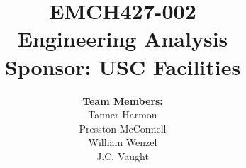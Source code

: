 \documentclass[12pt]{article}
\begin{document}
\title{
    \vspace{2in}
    \textbf{EMCH427-002} \\[1ex]
    \textbf{Engineering Analysis} \\[1ex]
    \textbf{Sponsor: USC Facilities} \\[1ex]
    \vspace{2in}
}

\author{
    \textbf{Team Members:} \\[2ex]
    Tanner Harmon\\[1ex]
    Presston McConnell\\[1ex]
    William Wenzel\\[1ex]
    J.C. Vaught\\[2ex]
}

\date{}

\maketitle
\thispagestyle{fancy}
\newpage
\end{document}
